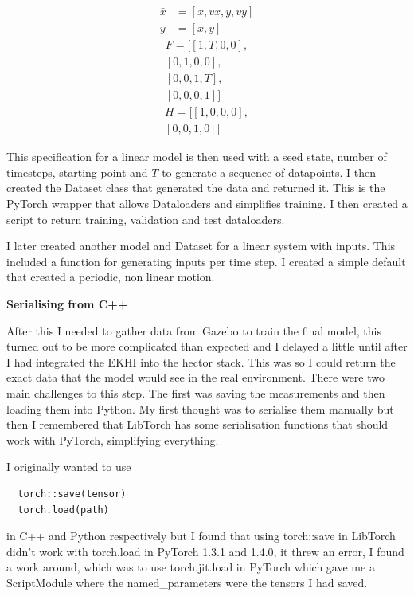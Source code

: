 \documentclass[]{../resources/final_report}
\begin{document}
\begin{align*}
  \bar{x} &= [x, vx, y, vy]\\
  \bar{y} &= [x, y] 
\end{align*}
\begin{align*}
  F = [[1, T, 0, 0],\\
       [0, 1, 0, 0],\\
       [0, 0, 1, T],\\
       [0, 0, 0, 1]]
\end{align*}
\begin{align*}
  H = [[1, 0, 0, 0],\\
       [0, 0, 1, 0]]
\end{align*}

This specification for a linear model is then used with a seed state, number of timesteps, starting point and $T$ to generate a sequence of datapoints. I then created the Dataset class that generated the data and returned it. This is the PyTorch wrapper that allows Dataloaders and simplifies training. I then created a script to return training, validation and test dataloaders.

I later created another model and Dataset for a linear system with inputs. This included a function for generating inputs per time step. I created a simple default that created a periodic, non linear motion.

\textbf{Serialising from C++}

After this I needed to gather data from Gazebo to train the final model, this turned out to be more complicated than expected and I delayed a little until after I had integrated the EKHI into the hector stack. This was so I could return the exact data that the model would see in the real environment.
There were two main challenges to this step. The first was saving the measurements and then loading them into Python. My first thought was to serialise them manually but then I remembered that LibTorch has some serialisation functions that should work with PyTorch, simplifying everything. 

\pagebreak
I originally wanted to use

\begin{verbatim}
  torch::save(tensor)
  torch.load(path)
\end{verbatim}

in C++ and Python respectively but I found that using torch::save in LibTorch didn't work with torch.load in PyTorch 1.3.1 and 1.4.0, it threw an error, I found a work around, which was to use torch.jit.load in PyTorch which gave me a ScriptModule where the named\_parameters were the tensors I had saved.
\end{document}
